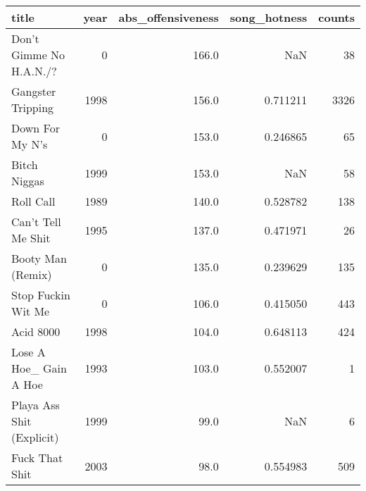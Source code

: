 \begin{tabular}{lrrrr}
\toprule
                     title &  year &  abs\_offensiveness &  song\_hotness &  counts \\
\midrule
   Don't Gimme No H.A.N./? &     0 &              166.0 &           NaN &      38 \\
         Gangster Tripping &  1998 &              156.0 &      0.711211 &    3326 \\
           Down For My N's &     0 &              153.0 &      0.246865 &      65 \\
              Bitch Niggas &  1999 &              153.0 &           NaN &      58 \\
                 Roll Call &  1989 &              140.0 &      0.528782 &     138 \\
        Can't Tell Me Shit &  1995 &              137.0 &      0.471971 &      26 \\
         Booty Man (Remix) &     0 &              135.0 &      0.239629 &     135 \\
        Stop Fuckin Wit Me &     0 &              106.0 &      0.415050 &     443 \\
                 Acid 8000 &  1998 &              104.0 &      0.648113 &     424 \\
    Lose A Hoe\_ Gain A Hoe &  1993 &              103.0 &      0.552007 &       1 \\
 Playa Ass Shit (Explicit) &  1999 &               99.0 &           NaN &       6 \\
            Fuck That Shit &  2003 &               98.0 &      0.554983 &     509 \\
\bottomrule
\end{tabular}
